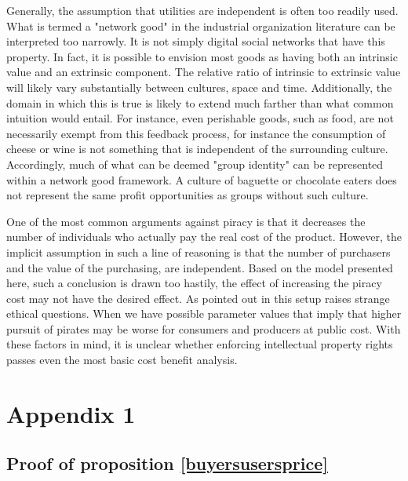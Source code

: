 \documentclass[12pt]{article}
\numberwithin{equation}{section}
\begin{document}
Generally, the assumption that utilities are independent is often too readily used. What is termed a "network good" in the industrial organization literature can be interpreted too narrowly. It is not simply digital social networks that have this property. In fact, it is possible to envision most goods as having both an intrinsic value and an extrinsic component. The relative ratio of intrinsic to extrinsic value will likely vary substantially between cultures, space and time. Additionally, the domain in which this is true is likely to extend much farther than what common intuition would entail. For instance, even perishable goods, such as food, are not necessarily exempt from this feedback process, for instance the consumption of cheese or wine is not something that is independent of the surrounding culture. Accordingly, much of what can be deemed "group identity" can be represented within a network good framework. A culture of baguette or chocolate eaters does not represent the same profit opportunities as groups without such culture.

One of the most common arguments against piracy is that it decreases the number of individuals who actually pay the real cost of the product.  However, the implicit assumption in such a line of reasoning is that the number of purchasers and the value of the purchasing, are independent. Based on the model presented here, such a conclusion is drawn too hastily, the effect of increasing the piracy cost may not have the desired effect. As pointed out in \cite{CRP91} this setup raises strange ethical questions. When we have possible parameter values that imply that higher pursuit of pirates may be worse for consumers and producers at public cost. With these factors in mind, it is unclear whether enforcing intellectual property rights passes even the most basic cost benefit analysis.

\newpage
\section{Appendix 1}



\subsection{Proof of proposition \ref{buyersusersprice}} \label{buyersuserspriceproof}
\end{document}
